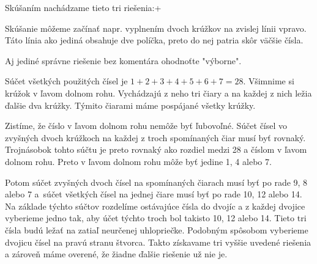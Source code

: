 {%
Skúšaním nachádzame tieto tri riešenia:+

Skúšanie môžeme začínať napr. vyplnením dvoch krúžkov na zvislej línii vpravo.
Táto línia ako jediná obsahuje dve políčka, preto do nej patria skôr väčšie čísla.

\hodnotenied
Aj jediné správne riešenie bez komentára ohodnoťte "výborne".

\poznamka
Súčet všetkých použitých čísel je $1 + 2 + 3+4+ 5 + 6 + 7 = 28$.
Všimnime si krúžok v ľavom dolnom rohu. Vychádzajú z neho tri čiary a na každej z nich
ležia ďalšie dva krúžky.  Týmito čiarami máme pospájané všetky krúžky.

Zistíme, že číslo v ľavom dolnom rohu nemôže byť ľubovoľné.
Súčet čísel vo zvyšných dvoch krúžkoch na každej z troch spomínaných čiar musí byť rovnaký.
Trojnásobok tohto súčtu je preto rovnaký ako rozdiel medzi 28 a číslom v ľavom dolnom rohu.
Preto v ľavom dolnom rohu môže byť jedine 1, 4 alebo 7.

Potom súčet zvyšných dvoch čísel na spomínaných čiarach musí byť po rade 9, 8 alebo 7
a~súčet všetkých čísel na jednej čiare musí byť po rade 10, 12 alebo 14.
Na základe týchto súčtov rozdelíme ostávajúce čísla do dvojíc a z každej dvojice vyberieme
jedno tak, aby účet týchto troch bol takisto 10, 12 alebo 14. Tieto tri čísla budú ležať na zatiaľ
neurčenej uhlopriečke. Podobným spôsobom vyberieme dvojicu čísel na pravú stranu štvorca.
Takto získavame tri vyššie uvedené riešenia a zároveň máme overené, že žiadne ďalšie riešenie už nie je.
}

